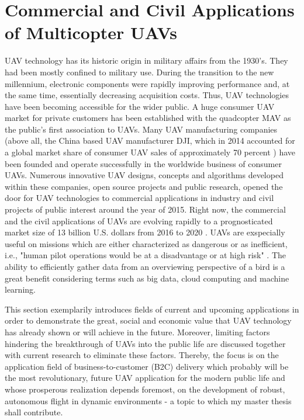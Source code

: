 
\section{Commercial and Civil Applications of Multicopter UAVs} \label{Chapter2Section2}

UAV technology has its historic origin
in military affairs from the 1930's.
They had been mostly confined to military use.
During the transition to the new millennium,
electronic components were rapidly improving performance
and, at the same time, essentially decreasing acquisition costs.
Thus, UAV technologies have been becoming 
accessible for the wider public.
A huge consumer UAV market for private customers
has been established 
with the quadcopter MAV as the public's first association to UAVs.
Many UAV manufacturing
companies
(above all, the China based UAV manufacturer DJI,
which in 2014 accounted for a global market share of consumer UAV sales of
approximately 70 percent
\cite{Statista2015})
have been founded and
operate successfully in the worldwide business
of consumer UAVs.
Numerous innovative
UAV designs, concepts and algorithms
developed within these companies, open source projects and public research,
opened the door for UAV technologies
to commercial applications in industry
and civil projects of public interest
around
the year of 2015.
Right now, the commercial and the civil applications of UAVs
are evolving rapidly to a prognosticated market size of
13 billion U.S. dollars from 2016 to 2020 \cite{Goldman}.
UAVs are exspecially useful on missions
which are either characterized 
as dangerous or as inefficient, 
i.e., "human pilot operations would be at a disadvantage or at high risk" \cite{Watts2012}.
The ability to efficiently gather data from an overviewing perspective of a bird
is a great benefit considering terms such as big data, cloud computing and machine learning.
\cite{Garcia2019}

This section exemplarily introduces
fields of current and upcoming applications in order
to demonstrate the great, social and economic value
that UAV technology has already shown or will achieve in the future.
Moreover, limiting factors hindering
the breakthrough of UAVs into the public life
are discussed together with current research
to eliminate these factors.
Thereby, the focus is on the application field of
business-to-customer (B2C) delivery
which probably will be the most revolutionary, future UAV application
for the modern public life and
whose prosperous 
realization depends foremost, 
on the development of robust,
autonomous flight in dynamic environments -
a topic to which my master thesis shall contribute.


